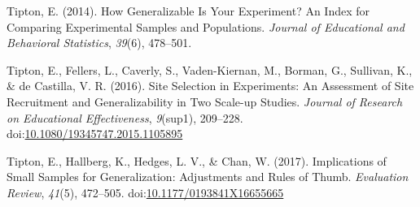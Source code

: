 \documentclass[man,floatsintext]{apa6}
\theoremstyle{definition}
\theoremstyle{definition}
\theoremstyle{definition}
\theoremstyle{remark}
\begin{document}
\leavevmode\hypertarget{ref-tiptonHowGeneralizableYour2014}{}%
Tipton, E. (2014). How Generalizable Is Your Experiment? An Index for
Comparing Experimental Samples and Populations. \emph{Journal of
Educational and Behavioral Statistics}, \emph{39}(6), 478--501.

\leavevmode\hypertarget{ref-tiptonSiteSelectionExperiments2016}{}%
Tipton, E., Fellers, L., Caverly, S., Vaden-Kiernan, M., Borman, G.,
Sullivan, K., \& de Castilla, V. R. (2016). Site Selection in
Experiments: An Assessment of Site Recruitment and Generalizability in
Two Scale-up Studies. \emph{Journal of Research on Educational
Effectiveness}, \emph{9}(sup1), 209--228.
doi:\href{https://doi.org/10.1080/19345747.2015.1105895}{10.1080/19345747.2015.1105895}

\leavevmode\hypertarget{ref-tiptonImplicationsSmallSamples2017}{}%
Tipton, E., Hallberg, K., Hedges, L. V., \& Chan, W. (2017).
Implications of Small Samples for Generalization: Adjustments and Rules
of Thumb. \emph{Evaluation Review}, \emph{41}(5), 472--505.
doi:\href{https://doi.org/10.1177/0193841X16655665}{10.1177/0193841X16655665}

\endgroup
\end{document}
